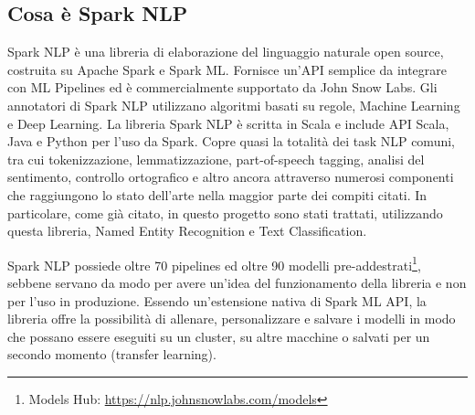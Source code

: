 \subsection{Cosa è Spark NLP}
Spark NLP è una libreria di elaborazione del linguaggio naturale open source, costruita su Apache Spark e Spark ML. Fornisce un’API semplice da integrare con ML Pipelines ed è commercialmente supportato da John Snow Labs.  Gli annotatori di Spark NLP utilizzano algoritmi basati su regole, Machine Learning e Deep Learning. La libreria Spark NLP è scritta in Scala e include API Scala, Java e Python per l’uso da Spark. Copre quasi la totalità dei task NLP comuni, tra cui tokenizzazione, lemmatizzazione, part-of-speech tagging, analisi del sentimento, controllo ortografico e altro ancora attraverso numerosi componenti che raggiungono lo stato dell'arte nella maggior parte dei compiti citati. In particolare, come già citato, in questo progetto sono stati trattati, utilizzando questa libreria, Named Entity Recognition e Text Classification. 

Spark NLP possiede oltre 70 pipelines ed oltre 90 modelli pre-addestrati\footnote{Models Hub: \href{https://nlp.johnsnowlabs.com/models}{https://nlp.johnsnowlabs.com/models}}, sebbene servano da modo per avere un’idea del funzionamento della libreria e non per l’uso in produzione. Essendo un'estensione nativa di Spark ML API, la libreria offre la possibilità di allenare, personalizzare e salvare i modelli in modo che possano essere eseguiti su un cluster, su altre macchine o salvati per un secondo momento (transfer learning).